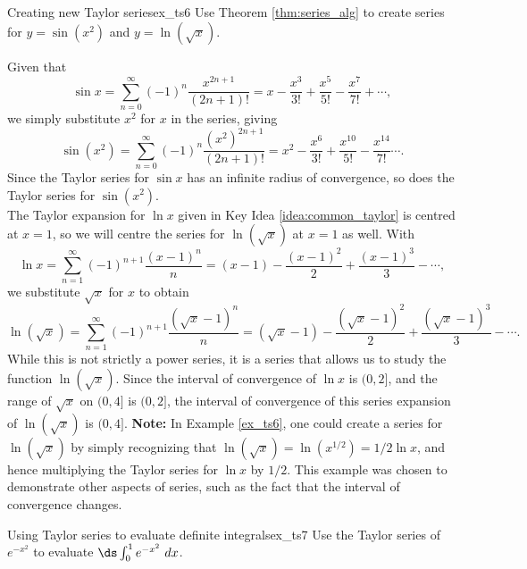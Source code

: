 %

\begin{example}{Creating new Taylor series}{ex_ts6}
{Use Theorem \ref{thm:series_alg} to create series for $y=\sin(x^2)$ and $y=\ln (\sqrt{x})$. 
}
\end{example}


\begin{solution}
{Given that 
$$\sin x = \sum_{n=0}^\infty (-1)^n\frac{x^{2n+1}}{(2n+1)!} = x-\frac{x^3}{3!}+\frac{x^5}{5!} -\frac{x^7}{7!}+\cdots,$$
we simply substitute $x^2$ for $x$ in the series, giving
$$\sin (x^2) = \sum_{n=0}^\infty (-1)^n\frac{(x^2)^{2n+1}}{(2n+1)!} = x^2-\frac{x^6}{3!}+\frac{x^{10}}{5!} -\frac{x^{14}}{7!}\cdots.$$
Since the Taylor series for $\sin x$ has an infinite radius of convergence, so does the Taylor series for $\sin(x^2)$.\\

The Taylor expansion for $\ln x$ given in Key Idea \ref{idea:common_taylor} is centred at $x=1$, so we will centre the series for $\ln (\sqrt{x})$ at $x=1$ as well.
With  $$\ln x = \sum_{n=1}^\infty(-1)^{n+1}\frac{(x-1)^n}{n} = (x-1)- \frac{(x-1)^2}{2} +\frac{(x-1)^3}{3}-\cdots,$$
we substitute $\sqrt{x}$ for $x$ to obtain
$$\ln (\sqrt{x}) = \sum_{n=1}^\infty(-1)^{n+1}\frac{(\sqrt{x}-1)^n}{n} = (\sqrt{x}-1)- \frac{(\sqrt{x}-1)^2}{2} +\frac{(\sqrt{x}-1)^3}{3}-\cdots.$$
While this is not strictly a power series, it is a series that allows us to study the function $\ln(\sqrt{x})$. Since the interval of convergence of $\ln x$ is $(0,2]$, and the range of $\sqrt{x}$ on $(0,4]$ is $(0,2]$, the interval of convergence of this series expansion of $\ln(\sqrt{x})$ is $(0,4]$.
{\textbf{Note:} In Example \ref{ex_ts6}, one could create a series for $\ln(\sqrt{x})$ by simply recognizing that $\ln(\sqrt{x}) = \ln (x^{1/2}) = 1/2\ln x$, and hence multiplying the Taylor series for $\ln x$ by $1/2$. This example was chosen to demonstrate other aspects of series, such as the fact that the interval of convergence changes.}
}
\end{solution}




\begin{example}{Using Taylor series to evaluate definite integrals}{ex_ts7}
{Use the Taylor series of $e^{-x^2}$ to evaluate $\ds \int_0^1e^{-x^2}\ dx$.
}
\end{example}


